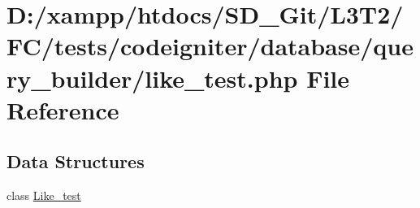 \hypertarget{tests_2codeigniter_2database_2query__builder_2like__test_8php}{}\section{D\+:/xampp/htdocs/\+S\+D\+\_\+\+Git/\+L3\+T2/\+F\+C/tests/codeigniter/database/query\+\_\+builder/like\+\_\+test.php File Reference}
\label{tests_2codeigniter_2database_2query__builder_2like__test_8php}
\subsection*{Data Structures}
\begin{DoxyCompactItemize}
\item 
class \hyperlink{class_like__test}{Like\+\_\+test}
\end{DoxyCompactItemize}
